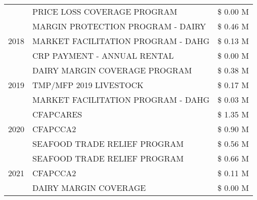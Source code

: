 \begin{tabular}{llr}
 & PRICE LOSS COVERAGE PROGRAM & \$ 0.00 M \\
\cline{1-3}
\multirow[t]{3}{*}{2018} & MARGIN PROTECTION PROGRAM - DAIRY & \$ 0.46 M \\
 & MARKET FACILITATION PROGRAM - DAHG & \$ 0.13 M \\
 & CRP PAYMENT - ANNUAL RENTAL & \$ 0.00 M \\
\cline{1-3}
\multirow[t]{3}{*}{2019} & DAIRY MARGIN COVERAGE PROGRAM & \$ 0.38 M \\
 & TMP/MFP 2019 LIVESTOCK & \$ 0.17 M \\
 & MARKET FACILITATION PROGRAM - DAHG & \$ 0.03 M \\
\cline{1-3}
\multirow[t]{3}{*}{2020} & CFAPCARES & \$ 1.35 M \\
 & CFAPCCA2 & \$ 0.90 M \\
 & SEAFOOD TRADE RELIEF PROGRAM & \$ 0.56 M \\
\cline{1-3}
\multirow[t]{3}{*}{2021} & SEAFOOD TRADE RELIEF PROGRAM & \$ 0.66 M \\
 & CFAPCCA2 & \$ 0.11 M \\
 & DAIRY MARGIN COVERAGE & \$ 0.00 M \\
\cline{1-3}
\bottomrule
\end{tabular}
